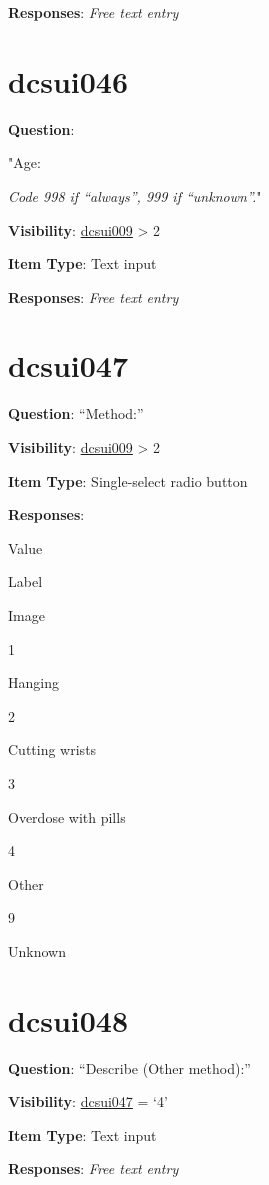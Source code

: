 \documentclass[]{book}
\begin{document}
\textbf{Responses}: \emph{Free text entry}

\hypertarget{dcsui046}{%
\section{dcsui046}\label{dcsui046}}

\textbf{Question}:

"Age:

\emph{Code 998 if ``always'', 999 if ``unknown''.}"

\textbf{Visibility}: \protect\hyperlink{dcsui009}{dcsui009} \textgreater{} 2

\textbf{Item Type}: Text input

\textbf{Responses}: \emph{Free text entry}

\hypertarget{dcsui047}{%
\section{dcsui047}\label{dcsui047}}

\textbf{Question}: ``Method:''

\textbf{Visibility}: \protect\hyperlink{dcsui009}{dcsui009} \textgreater{} 2

\textbf{Item Type}: Single-select radio button

\textbf{Responses}:

Value

Label

Image

1

Hanging

2

Cutting wrists

3

Overdose with pills

4

Other

9

Unknown

\hypertarget{dcsui048}{%
\section{dcsui048}\label{dcsui048}}

\textbf{Question}: ``Describe (Other method):''

\textbf{Visibility}: \protect\hyperlink{dcsui047}{dcsui047} = `4'

\textbf{Item Type}: Text input

\textbf{Responses}: \emph{Free text entry}
\end{document}
